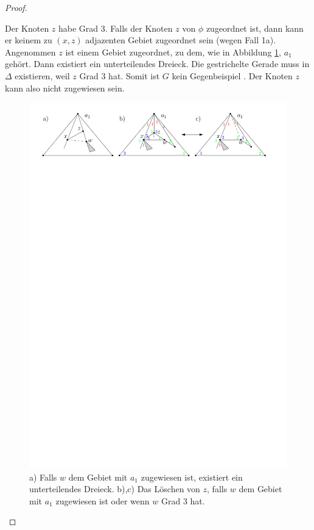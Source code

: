 \begin{proof}
\begin{description}[leftmargin =0pt, font = \rmfamily ]
\item[Fall 1b:] Der Knoten $z$ habe Grad 3. Falls der Knoten $z$ von $\phi$ zugeordnet ist, dann kann er keinem zu $(x,z)$ adjazenten Gebiet zugeordnet sein (wegen Fall 1a). Angenommen $z$ ist einem Gebiet zugeordnet, zu dem, wie in Abbildung \ref{pic_lem5_4}, $a_1$ gehört. Dann existiert ein unterteilendes Dreieck. Die gestrichelte Gerade muss in $\Delta$ existieren, weil $z$ Grad 3 hat. Somit ist $G$ kein Gegenbeispiel . Der Knoten $z$ kann also nicht zugewiesen sein.

\begin{figure}[h]
	\centering
	  \includegraphics[width=1\textwidth]{lem5_4.pdf}
\caption{a) Falls $w$ dem Gebiet mit $a_1$ zugewiesen ist, existiert ein unterteilendes Dreieck. b),c) Das Löschen von $z$, falls $w$ dem Gebiet mit $a_1$ zugewiesen ist oder wenn $w$ Grad 3 hat. }
    	\label{pic_lem5_4}
\end{figure}


\end{description}
\end{proof}
